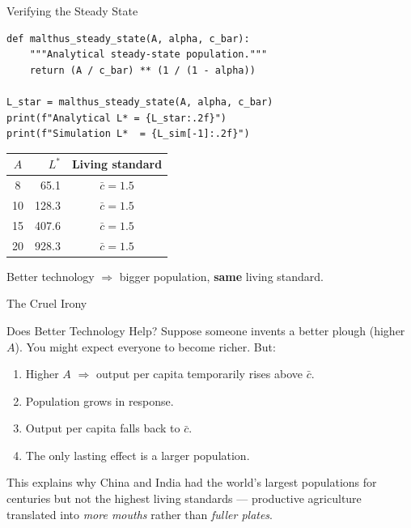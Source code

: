 \documentclass[aspectratio=169, 10pt]{beamer}
\begin{document}
\begin{frame}[fragile]{Verifying the Steady State}
\begin{lstlisting}
def malthus_steady_state(A, alpha, c_bar):
    """Analytical steady-state population."""
    return (A / c_bar) ** (1 / (1 - alpha))

L_star = malthus_steady_state(A, alpha, c_bar)
print(f"Analytical L* = {L_star:.2f}")
print(f"Simulation L*  = {L_sim[-1]:.2f}")
\end{lstlisting}
\vspace{0.3em}
\begin{center}
\begin{tabular}{crc}
\toprule
$A$ & $L^*$ & Living standard \\
\midrule
 8  &  65.1 & $\bar{c} = 1.5$ \\
10  & 128.3 & $\bar{c} = 1.5$ \\
15  & 407.6 & $\bar{c} = 1.5$ \\
20  & 928.3 & $\bar{c} = 1.5$ \\
\bottomrule
\end{tabular}
\end{center}
Better technology $\Rightarrow$ bigger population, \textbf{same} living standard.
\end{frame}

\begin{frame}{The Cruel Irony}
\begin{block}{Does Better Technology Help?}
  Suppose someone invents a better plough (higher $A$).
  You might expect everyone to become richer. But:
\end{block}
\vspace{0.3em}
\begin{enumerate}
  \item Higher $A$ $\Rightarrow$ output per capita temporarily rises above $\bar{c}$.
  \item Population grows in response.
  \item Output per capita falls back to $\bar{c}$.
  \item \alert{The only lasting effect is a larger population.}
\end{enumerate}
\vspace{0.5em}
This explains why China and India had the world's largest populations
for centuries but not the highest living standards --- productive
agriculture translated into \textit{more mouths} rather than
\textit{fuller plates}.
\end{frame}
\end{document}
